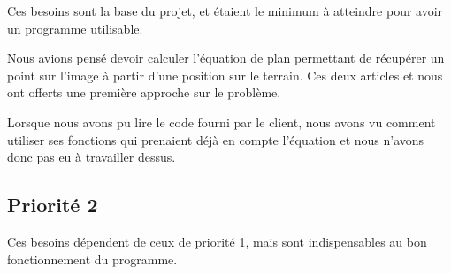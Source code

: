 Ces besoins sont la base du projet, et étaient le minimum à 
atteindre pour avoir un programme utilisable. 
\bigskip

Nous avions pensé devoir calculer l'équation de plan permettant  
de récupérer un point sur l'image à partir d'une position sur le 
terrain. Ces deux articles \cite{ref1} et \cite{ref2} nous ont 
offerts une première approche sur le problème.

Lorsque nous avons pu lire le code fourni par le client, nous 
avons vu comment utiliser ses fonctions qui prenaient déjà en 
compte l'équation et nous n'avons donc pas eu à travailler 
dessus. 

\subsection{Priorité 2}

Ces besoins dépendent de ceux de priorité 1, mais sont 
indispensables au bon fonctionnement du programme.
\bigskip

